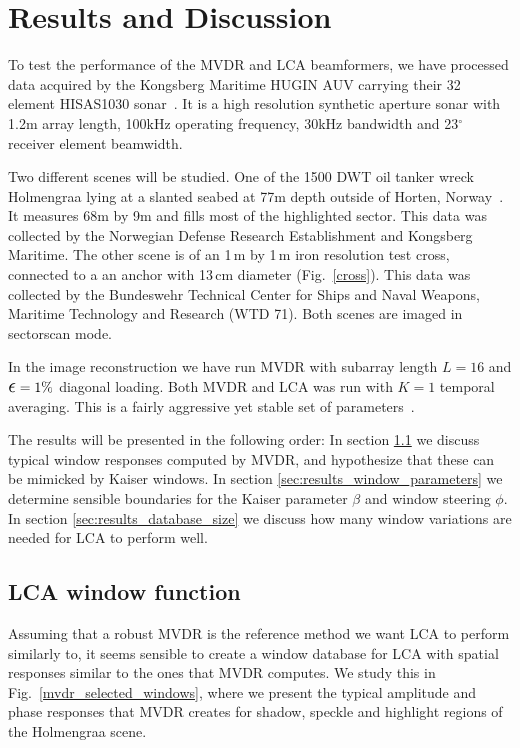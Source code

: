 \documentclass[10pt,journal,draftclsnofoot,onecolumn]{IEEEtran}
\newcommand\Fig[1]{Fig.~\ref{#1}}
\newcommand\1{\vec 1}
\begin{document}
\section{Results and Discussion}\label{sec:results_discussion}

To test the performance of the MVDR and LCA beamformers, we have processed data acquired by the Kongsberg Maritime HUGIN AUV carrying their 32 element HISAS1030 sonar~\cite{Hansen2011}. It is a high resolution synthetic aperture sonar with 1.2\;m array length, 100\;kHz operating frequency, 30\;kHz bandwidth and 23$^\circ$ receiver element beamwidth.

Two different scenes will be studied. One of the 1500 DWT oil tanker wreck Holmengraa lying at a slanted seabed at 77\;m depth outside of Horten, Norway~\cite{holmengraa}. It measures 68\;m by 9\;m and fills most of the highlighted sector. This data was collected by the Norwegian Defense Research Establishment and Kongsberg Maritime. The other scene is of an 1\,m by 1\,m iron resolution test cross, connected to a an anchor with 13\,cm diameter (\Fig{cross}). This data was collected by the Bundeswehr Technical Center for Ships and Naval Weapons, Maritime Technology and Research (WTD 71). Both scenes are imaged in sectorscan mode.

In the image reconstruction we have run MVDR with subarray length $L=16$ and $\text{\large$\epsilon$}=1\%$ diagonal loading. Both MVDR and LCA was run with $K=1$ temporal averaging. This is a fairly aggressive yet stable set of parameters~\cite{Synnevag2009}.

The results will be presented in the following order: In section \ref{sec:results_lca_window_function} we discuss typical window responses computed by MVDR, and hypothesize that these can be mimicked by Kaiser windows. In section \ref{sec:results_window_parameters} we determine sensible boundaries for the Kaiser parameter $\beta$ and window steering $\phi$. In section \ref{sec:results_database_size} we discuss how many window variations are needed for LCA to perform well. 

\subsection{LCA window function}\label{sec:results_lca_window_function}

Assuming that a robust MVDR is the reference method we want LCA to perform similarly to, it seems sensible to create a window database for LCA with spatial responses similar to the ones that MVDR computes. We study this in \Fig{mvdr_selected_windows}, where we present the typical amplitude and phase responses that MVDR creates for shadow, speckle and highlight regions of the Holmengraa scene.
\end{document}
